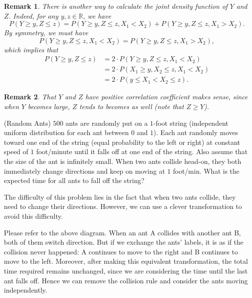 \documentclass[12pt,letterpaper, onecolumn]{exam}
\newtheorem{remark}{Remark}
\begin{document}
\begin{questions}
\begin{remark}
            There is another way to calculate the joint density function of $Y$ and $Z$. Indeed, for any $y,z\in\mathbb{R}$, we have 
            $$P(Y\ge y,Z\le z)=P(Y\ge y,Z\le z,X_1<X_2)+P(Y\ge y,Z\le z,X_1>X_2).$$
            By symmetry, we must have 
            $$P(Y\ge y,Z\le z,X_1<X_2)=P(Y\ge y,Z\le z,X_1>X_2),$$
            which implies that 
            \begin{align*}
                P(Y\ge y,Z\le z)&=2\cdot P(Y\ge y,Z\le z,X_1<X_2)\\
                &=2\cdot P(X_1\ge y,X_2\le z,X_1<X_2)\\
                &=2\cdot P(y\le X_1<X_2\le z).
            \end{align*}
        \end{remark}
        \begin{remark}
            That $Y$ and $Z$ have positive correlation coefficient makes sense, since when $Y$ becomes large, $Z$ tends to becomes as well (note that $Z\ge Y$).
        \end{remark}

        \question[](Random Ants) $500$ ants are randomly put on a $1$-foot string (independent uniform distribution for each ant between $0$ and $1$). Each ant randomly moves toward one end of the string (equal probability to the left or right) at constant speed of $1$ foot/minute until it falls off at one end of the string. Also assume that the size of the ant is infinitely small. When two ants collide head-on, they both immediately change directions and keep on moving at $1$ foot/min. What is the expected time for all ants to fall off the string?
        \begin{solution}
            The difficulty of this problem lies in the fact that when two ants collide, they need to change their directions. However, we can use a clever transformation to avoid this difficulty.

            \quad Please refer to the above diagram. When an ant A collides with another ant B, both of them switch direction. But if we exchange the ants' labels, it is as if the collision never happened: A continues to move to the right and B continues to move to the left. Moreover, after making this equivalent transformation, the total time required remains unchanged, since we are considering the time until the last ant falls off. Hence we can remove the collision rule and consider the ants moving independently.


\end{solution}
\end{questions}
\end{document}

